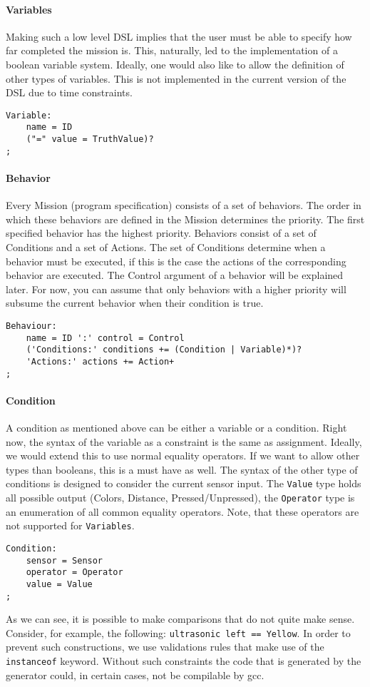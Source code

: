\documentclass{scrartcl}
\begin{document}
\paragraph{Variables}
Making such a low level DSL implies that the user must be able to specify how far completed the mission is.
This, naturally, led to the implementation of a boolean variable system.
Ideally, one would also like to allow the definition of other types of variables.
This is not implemented in the current version of the DSL due to time constraints.
\begin{verbatim}
Variable:
	name = ID
	("=" value = TruthValue)?
;
\end{verbatim}

\paragraph{Behavior}
Every Mission (program specification) consists of a set of behaviors.
The order in which these behaviors are defined in the Mission determines the priority.
The first specified behavior has the highest priority.
Behaviors consist of a set of Conditions and a set of Actions.
The set of Conditions determine when a behavior must be executed, if this is the case the actions of the corresponding behavior are executed.
The Control argument of a behavior will be explained later.
For now, you can assume that only behaviors with a higher priority will subsume the current behavior when their condition is true.
\begin{verbatim}
Behaviour:
	name = ID ':' control = Control
	('Conditions:' conditions += (Condition | Variable)*)?
	'Actions:' actions += Action+
;
\end{verbatim}

\paragraph{Condition}
A condition as mentioned above can be either a variable or a condition.
Right now, the syntax of the variable as a constraint is the same as assignment.
Ideally, we would extend this to use normal equality operators.
If we want to allow other types than booleans, this is a must have as well.
The syntax of the other type of conditions is designed to consider the current sensor input.
The \texttt{Value} type holds all possible output (Colors, Distance, Pressed/Unpressed), the \texttt{Operator} type is an enumeration of all common equality operators.
Note, that these operators are not supported for \texttt{Variables}.
\begin{verbatim}
Condition:
	sensor = Sensor
	operator = Operator
	value = Value
;
\end{verbatim}
As we can see, it is possible to make comparisons that do not quite make sense.
Consider, for example, the following: \texttt{ultrasonic left == Yellow}.
In order to prevent such constructions, we use validations rules that make use of the \texttt{instanceof} keyword.
Without such constraints the code that is generated by the generator could, in certain cases, not be compilable by gcc.
\end{document}
